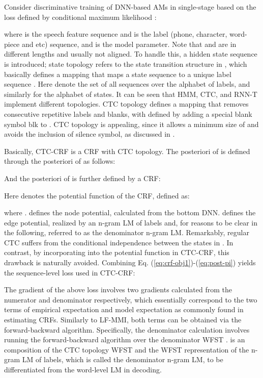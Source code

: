 \documentclass[a4paper]{article}
\begin{document}
Consider discriminative training of DNN-based AMs in single-stage based on the loss defined by conditional maximum likelihood \cite{Xiang2019CRF}:

where  is the speech feature sequence and  is the label (phone, character, word-piece and etc) sequence, and  is the model parameter.
Note that  and  are in different lengths and usually not aligned.
To handle this, a hidden state sequence  is introduced; state topology refers to the state transition structure in , which basically 
defines a mapping  that maps a state sequence  to a unique label sequence .
Here  denote the set of all sequences over the alphabet  of labels, and  similarly for the alphabet  of states.
It can be seen that HMM, CTC, and RNN-T implement different topologies.
CTC topology defines a mapping that removes consecutive repetitive labels and blanks, with  defined by adding a special blank symbol blk to .
CTC topology is appealing, since it allows a minimum size of  and avoids the inclusion of silence symbol, as discussed in \cite{Xiang2019CRF}.

Basically, CTC-CRF is a CRF with CTC topology. The posteriori of  is defined through the posteriori of  as follows:

And the posteriori of  is further defined by a CRF:

Here  denotes the potential function of the CRF, defined as:

where . 
 defines the node potential, calculated from the bottom DNN.
 defines the edge potential, realized by an n-gram LM of labels and, for reasons to be clear in the following, referred to as the denominator n-gram LM.
Remarkably, regular CTC suffers from the conditional independence between the states in . In contrast, by incorporating  into the potential function in CTC-CRF, this drawback is naturally avoided.
Combining Eq. (\ref{eq:crf-obj1})-(\ref{eq:post-pi}) yields the sequence-level loss used in CTC-CRF:


The gradient of the above loss involves two gradients calculated from the numerator and denominator respectively, which essentially correspond to the two terms of empirical expectation and model expectation as commonly found in estimating CRFs.
Similarly to LF-MMI, both terms can be obtained via the forward-backward algorithm.
Specifically, the denominator calculation involves running the forward-backward algorithm over the denominator WFST .
 is an composition of the CTC topology WFST and the WFST representation of the n-gram LM of labels, which is called the denominator n-gram LM, to be differentiated from the word-level LM in decoding.
\end{document}
